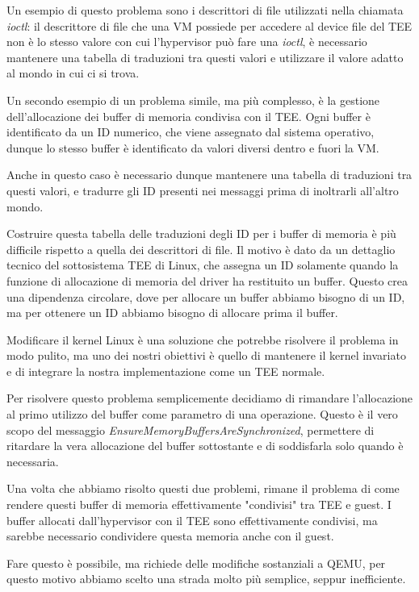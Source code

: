 \documentclass[12pt,italian]{report}
\begin{document}
Un esempio di questo problema sono i descrittori di file utilizzati nella
chiamata \textit{ioctl}: 
il descrittore di file che una VM possiede per accedere al device file del TEE
non è lo stesso valore con cui l'hypervisor può fare una \textit{ioctl},
è necessario mantenere una tabella di traduzioni tra questi valori e
utilizzare il valore adatto al mondo in cui ci si trova.

Un secondo esempio di un problema simile, ma più complesso, è la gestione
dell'allocazione dei buffer di memoria condivisa con il TEE.
Ogni buffer è identificato da un ID numerico, che viene assegnato dal sistema
operativo, dunque lo stesso buffer è identificato da valori diversi dentro
e fuori la VM.

Anche in questo caso è necessario dunque mantenere una tabella di traduzioni
tra questi valori, e tradurre gli ID presenti nei messaggi prima di inoltrarli
all'altro mondo.

Costruire questa tabella delle traduzioni degli ID per i buffer di memoria è
più difficile rispetto a quella dei descrittori di file.
Il motivo è dato da un dettaglio tecnico del sottosistema TEE di Linux, che
assegna un ID solamente quando la funzione di allocazione di memoria del driver
ha restituito un buffer.
Questo crea una dipendenza circolare, dove per allocare un buffer
abbiamo bisogno di un ID, ma per ottenere un ID abbiamo bisogno di
allocare prima il buffer.

Modificare il kernel Linux è una soluzione che potrebbe risolvere il problema
in modo pulito, ma uno dei nostri obiettivi è quello di mantenere il kernel
invariato e di integrare la nostra implementazione come un TEE normale. 

Per risolvere questo problema semplicemente decidiamo di rimandare
l'allocazione
al primo utilizzo del buffer come parametro di una operazione.
Questo è il vero scopo del messaggio
\textit{EnsureMemoryBuffersAreSynchronized},
permettere di ritardare la vera allocazione del buffer sottostante e
di soddisfarla solo quando è necessaria.

\bigbreak \noindent

Una volta che abbiamo risolto questi due problemi, rimane il problema di
come rendere questi buffer di memoria effettivamente "condivisi" tra TEE
e guest.
I buffer allocati dall'hypervisor con il TEE sono effettivamente condivisi,
ma sarebbe necessario condividere questa memoria anche con il guest.

Fare questo è possibile, ma richiede delle modifiche sostanziali a QEMU, per
questo motivo abbiamo scelto una strada molto più semplice, seppur
inefficiente.
\end{document}
